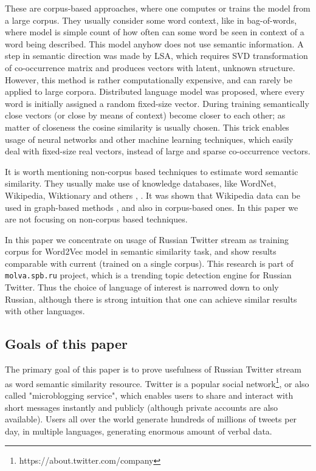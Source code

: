 \documentclass{llncs}
\begin{document}
These are corpus-based approaches, where one computes or trains the model from a large corpus. They usually consider some word context, like in bag-of-words, where model is simple count of how often can some word be seen in context of a word being described. This model anyhow does not use semantic information. A step in semantic direction was made by LSA, which requires SVD transformation of co-occurrence matrix and produces vectors with latent, unknown structure. However, this method is rather computationally expensive, and can rarely be applied to large corpora. Distributed language model was proposed, where every word is initially assigned a random fixed-size vector. During training semantically close vectors (or close by means of context) become closer to each other; as matter of closeness the cosine similarity is usually chosen. This trick enables usage of neural networks and other machine learning techniques, which easily deal with fixed-size real vectors, instead of large and sparse co-occurrence vectors. 

It is worth mentioning non-corpus based techniques to estimate word semantic similarity. They usually make use of knowledge databases, like WordNet, Wikipedia, Wiktionary and others \cite{Zesch}, \cite{Bar}. It was shown that Wikipedia data can be used in graph-based methods \cite{Zesch2007}, and also in corpus-based ones. In this paper we are not focusing on non-corpus based techniques.

In this paper we concentrate on usage of Russian Twitter stream as training corpus for Word2Vec model in semantic similarity task, and show results comparable with current (trained on a single corpus). This research is part of {\tt molva.spb.ru} project, which is a trending topic detection engine for Russian Twitter. Thus the choice of language of interest is narrowed down to only Russian, although there is strong intuition that one can achieve similar results with other languages.

%
\subsection{Goals of this paper}
%
The primary goal of this paper is to prove usefulness of Russian Twitter stream as word semantic similarity resource. Twitter is a popular social network\footnote{https://about.twitter.com/company}, or also called "microblogging service", which enables users to share and interact with short messages instantly and publicly (although private accounts are also available). Users all over the world generate hundreds of millions of tweets per day, in multiple languages, generating enormous amount of verbal data.
\end{document}
